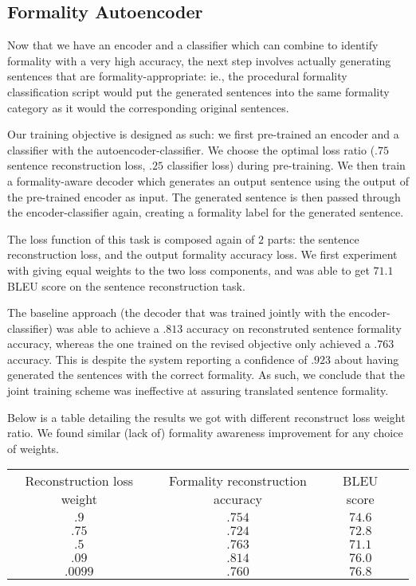 \documentclass[11pt]{article}
\begin{document}
\subsection{Formality Autoencoder}

Now that we have an encoder and a classifier which can combine to identify formality with a very high accuracy, the next step involves actually generating sentences that are formality-appropriate: ie., the procedural formality classification script would put the generated sentences into the same formality category as it would the corresponding original sentences.

Our training objective is designed as such: we first pre-trained an encoder and a classifier with the autoencoder-classifier. We choose the optimal loss ratio ($.75$ sentence reconstruction loss, $.25$ classifier loss) during pre-training. We then train a formality-aware decoder which generates an output sentence using the output of the pre-trained encoder as input. The generated sentence is then passed through the encoder-classifier again, creating a formality label for the generated sentence.

The loss function of this task is composed again of $2$ parts: the sentence reconstruction loss, and the output formality accuracy loss. We first experiment with giving equal weights to the two loss components, and was able to get $71.1$ BLEU score on the sentence reconstruction task.

The baseline approach (the decoder that was trained jointly with the encoder-classifier) was able to achieve a $.813$ accuracy on reconstruted sentence formality accuracy, whereas the one trained on the revised objective only achieved a $.763$ accuracy. This is despite the system reporting a confidence of $.923$ about having generated the sentences with the correct formality. As such, we conclude that the joint training scheme was ineffective at assuring translated sentence formality.  

Below is a table detailing the results we got with different reconstruct loss weight ratio. We found similar (lack of) formality awareness improvement for any choice of weights. 

\begin{tabular}{ c c c c }
    Reconstruction loss weight & Formality reconstruction accuracy & BLEU score \\
    $.9$ & $.754$ & $74.6$ \\
    $.75$ & $.724$ & $72.8$ \\
    $.5$ & $.763$ & $71.1$ \\
    $.09$ & $.814$ & $76.0$ \\
    $.0099$ & $.760$ & $76.8$ \\
\end{tabular}
\end{document}
